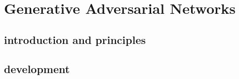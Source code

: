 \chapter{Generative Adversarial Networks}
\label{chapter:gan}


\section{introduction and principles}

\section{development}